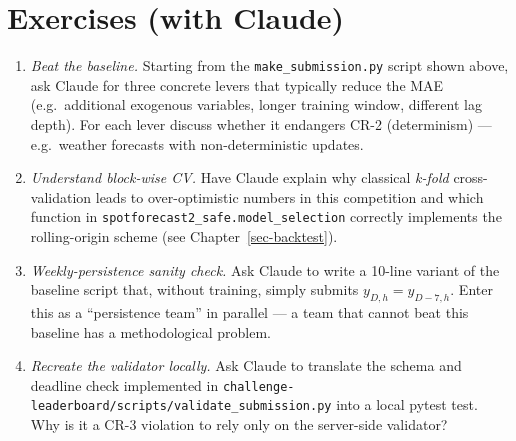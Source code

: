 \documentclass[
  english,
  letterpaper,
]{scrbook}
\providecommand{\tightlist}{%
  \setlength{\itemsep}{0pt}\setlength{\parskip}{0pt}}
\begin{document}
\section*{Exercises (with Claude)}\label{exercises-with-claude}


\begin{tcolorbox}[enhanced jigsaw, arc=.35mm, bottomrule=.15mm, bottomtitle=1mm, breakable, colback=white, colbacktitle=quarto-callout-tip-color!10!white, colframe=quarto-callout-tip-color-frame, coltitle=black, left=2mm, leftrule=.75mm, opacityback=0, opacitybacktitle=0.6, rightrule=.15mm, title=\textcolor{quarto-callout-tip-color}{\faLightbulb}\hspace{0.5em}{Exercises (with Claude)}, titlerule=0mm, toprule=.15mm, toptitle=1mm]

\begin{enumerate}
\def\labelenumi{\arabic{enumi}.}
\tightlist
\item
  \emph{Beat the baseline.} Starting from the
  \texttt{make\_submission.py} script shown above, ask Claude for three
  concrete levers that typically reduce the MAE (e.g.~additional
  exogenous variables, longer training window, different lag depth). For
  each lever discuss whether it endangers CR-2 (determinism) ---
  e.g.~weather forecasts with non-deterministic updates.
\item
  \emph{Understand block-wise CV.} Have Claude explain why classical
  \emph{k-fold} cross-validation leads to over-optimistic numbers in
  this competition and which function in
  \texttt{spotforecast2\_safe.model\_selection} correctly implements the
  rolling-origin scheme (see Chapter~\ref{sec-backtest}).
\item
  \emph{Weekly-persistence sanity check.} Ask Claude to write a 10-line
  variant of the baseline script that, without training, simply submits
  \(y_{D,h} = y_{D-7,h}\). Enter this as a ``persistence team'' in
  parallel --- a team that cannot beat this baseline has a
  methodological problem.
\item
  \emph{Recreate the validator locally.} Ask Claude to translate the
  schema and deadline check implemented in
  \texttt{challenge-leaderboard/scripts/validate\_submission.py} into a
  local pytest test. Why is it a CR-3 violation to rely only on the
  server-side validator?
\end{enumerate}

\end{tcolorbox}
\end{document}
